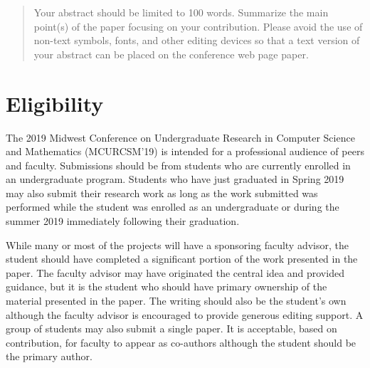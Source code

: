 \documentclass{mcurcsm}
\begin{document}

\maketitle
\begin{abstract}
Your abstract should be limited to 100 words. 
Summarize the main point(s) of the paper 
focusing on your contribution. Please avoid the 
use of non-text symbols, fonts, and other editing 
devices so that a text version of your abstract can 
be placed on the conference web page paper.
\end{abstract}

\section{Eligibility}
The 2019 Midwest Conference on Undergraduate Research in Computer Science and
Mathematics (MCURCSM'19) is intended for a professional audience of peers and
faculty. Submissions should be from students who are currently enrolled in an
undergraduate program. Students who have just graduated in Spring 2019 may also
submit their research work as long as the work submitted was performed while
the student was enrolled as an undergraduate or during the summer 2019
immediately following their graduation. 

While many or most of the projects will have a 
sponsoring faculty advisor, the student should 
have completed a significant portion of the work 
presented in the paper. The faculty advisor may 
have originated the central idea and provided 
guidance, but it is the student who should have 
primary ownership of the material presented in 
the paper. The writing should also be the 
student's own although the faculty advisor is 
encouraged to provide generous editing support. 
A group of students may also submit a single 
paper. It is acceptable, based on contribution, for 
faculty to appear as co-authors although the 
student should be the primary author. 
\end{document}
